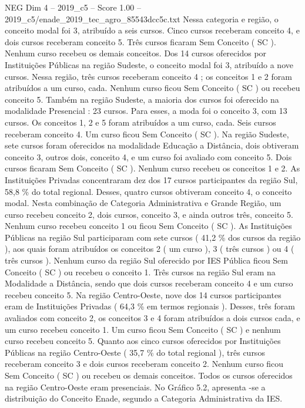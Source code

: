 \begin{textsample}{NEG Dim 4 – 2019\_c5 – Score 1.00 – 2019\_c5/enade\_2019\_tec\_agro\_85543dcc5c.txt}
Nessa categoria e região, o conceito modal foi 3, atribuído a seis cursos.
Cinco cursos receberam conceito 4, e dois cursos receberam conceito 5.
Três cursos ficaram Sem Conceito ( SC ).
Nenhum curso recebeu os demais conceitos.
Dos 14 cursos oferecidos por Instituições Públicas na região Sudeste, o conceito modal foi 3, atribuído a nove cursos.
Nessa região, três cursos receberam conceito 4 ; os conceitos 1 e 2 foram atribuídos a um curso, cada.
Nenhum curso ficou Sem Conceito ( SC ) ou recebeu conceito 5.
Também na região Sudeste, a maioria dos cursos foi oferecido na modalidade Presencial : 23 cursos.
Para esses, a moda foi o conceito 3, com 13 cursos.
Os conceitos 1, 2 e 5 foram atribuídos a um curso, cada.
Seis cursos receberam conceito 4.
Um curso ficou Sem Conceito ( SC ).
Na região Sudeste, sete cursos foram oferecidos na modalidade Educação a Distância, dois obtiveram conceito 3, outros dois, conceito 4, e um curso foi avaliado com conceito 5.
Dois cursos ficaram Sem Conceito ( SC ).
Nenhum curso recebeu os conceitos 1 e 2.
As Instituições Privadas concentraram dez dos 17 cursos participantes da região Sul, 58,8 \% do total regional.
Desses, quatro cursos obtiveram conceito 4, o conceito modal.
Nesta combinação de Categoria Administrativa e Grande Região, um curso recebeu conceito 2, dois cursos, conceito 3, e ainda outros três, conceito 5.
Nenhum curso recebeu conceito 1 ou ficou Sem Conceito ( SC ).
As Instituições Públicas na região Sul participaram com sete cursos ( 41,2 \% dos cursos da região ), aos quais foram atribuídos os conceitos 2 ( um curso ), 3 ( três cursos ) ou 4 ( três cursos ).
Nenhum curso da região Sul oferecido por IES Pública ficou Sem Conceito ( SC ) ou recebeu o conceito 1.
Três cursos na região Sul eram na Modalidade a Distância, sendo que dois cursos receberam conceito 4 e um curso recebeu conceito 5.
Na região Centro-Oeste, nove dos 14 cursos participantes eram de Instituições Privadas ( 64,3 \% em termos regionais ).
Desses, três foram avaliados com conceito 2, os conceitos 3 e 4 foram atribuídos a dois cursos cada, e um curso recebeu conceito 1.
Um curso ficou Sem Conceito ( SC ) e nenhum curso recebeu conceito 5.
Quanto aos cinco cursos oferecidos por Instituições Públicas na região Centro-Oeste ( 35,7 \% do total regional ), três cursos receberam conceito 3 e dois cursos receberam conceito 2.
Nenhum curso ficou Sem Conceito ( SC ) ou recebeu os demais conceitos.
Todos os cursos oferecidos na região Centro-Oeste eram presenciais.
No Gráfico 5.2, apresenta -se a distribuição do Conceito Enade, segundo a Categoria Administrativa da IES.

\end{textsample}
